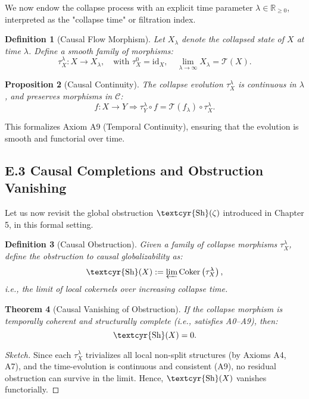\documentclass[11pt]{article}
\newtheorem{theorem}{Theorem}[section]
\newtheorem{definition}[theorem]{Definition}
\newtheorem{proposition}[theorem]{Proposition}
\newcommand{\Sha}{\text{\textcyr{Sh}}}
\begin{document}
We now endow the collapse process with an explicit time parameter $\lambda \in \mathbb{R}_{\geq 0}$,  
interpreted as the "collapse time" or filtration index.

\begin{definition}[Causal Flow Morphism]
Let $X_\lambda$ denote the collapsed state of $X$ at time $\lambda$.  
Define a smooth family of morphisms:
\[
\tau^\lambda_X : X \to X_\lambda, \quad \text{with } \tau^0_X = \text{id}_X, \quad \lim_{\lambda \to \infty} X_\lambda = \mathcal{T}(X).
\]
\end{definition}

\begin{proposition}[Causal Continuity]
The collapse evolution $\tau^\lambda_X$ is continuous in $\lambda$, and preserves morphisms in $\mathcal{C}$:
\[
f : X \to Y \Rightarrow \tau^\lambda_Y \circ f = \mathcal{T}(f_\lambda) \circ \tau^\lambda_X.
\]
\end{proposition}

This formalizes Axiom A9 (Temporal Continuity), ensuring that the evolution is smooth and functorial over time.

\subsection*{E.3 Causal Completions and Obstruction Vanishing}

Let us now revisit the global obstruction $\Sha(\zeta)$ introduced in Chapter 5, in this formal setting.

\begin{definition}[Causal Obstruction]
Given a family of collapse morphisms $\tau^\lambda_X$, define the obstruction to causal globalizability as:
\[
\Sha(X) := \varprojlim \mathrm{Coker}\left( \tau^\lambda_X \right),
\]
i.e., the limit of local cokernels over increasing collapse time.
\end{definition}

\begin{theorem}[Causal Vanishing of Obstruction]
If the collapse morphism is temporally coherent and structurally complete (i.e., satisfies A0–A9), then:
\[
\Sha(X) = 0.
\]
\end{theorem}

\begin{proof}[Sketch]
Since each $\tau^\lambda_X$ trivializes all local non-split structures (by Axioms A4, A7),  
and the time-evolution is continuous and consistent (A9), no residual obstruction can survive in the limit.  
Hence, $\Sha(X)$ vanishes functorially.
\end{proof}
\end{document}
